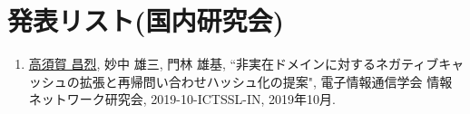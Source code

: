 \documentclass[12pt]{jarticle} %
\begin{document}
\section{発表リスト(国内研究会)}
\begin{enumerate}
 \item \underline{高須賀 昌烈}, 妙中 雄三, 門林 雄基, ``非実在ドメインに対するネガティブキャッシュの拡張と再帰問い合わせハッシュ化の提案", 電子情報通信学会 情報ネットワーク研究会, 2019-10-ICTSSL-IN, 2019年10月.
\end{enumerate}
\end{document}

